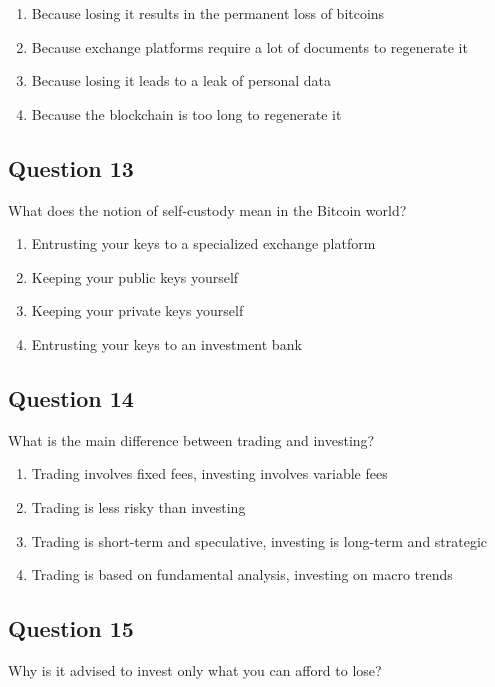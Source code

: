 \documentclass[12pt,a4paper]{article}
\begin{document}
\begin{enumerate}[label=\Alph*., leftmargin=*]
\item Because losing it results in the permanent loss of bitcoins
\item Because exchange platforms require a lot of documents to regenerate it
\item Because losing it leads to a leak of personal data
\item Because the blockchain is too long to regenerate it
\end{enumerate}

\bigskip


\subsection*{Question 13}
What does the notion of self-custody mean in the Bitcoin world?

\begin{enumerate}[label=\Alph*., leftmargin=*]
\item Entrusting your keys to a specialized exchange platform
\item Keeping your public keys yourself
\item Keeping your private keys yourself
\item Entrusting your keys to an investment bank
\end{enumerate}

\bigskip


\subsection*{Question 14}
What is the main difference between trading and investing?

\begin{enumerate}[label=\Alph*., leftmargin=*]
\item Trading involves fixed fees, investing involves variable fees
\item Trading is less risky than investing
\item Trading is short-term and speculative, investing is long-term and strategic
\item Trading is based on fundamental analysis, investing on macro trends
\end{enumerate}

\bigskip


\subsection*{Question 15}
Why is it advised to invest only what you can afford to lose?
\end{document}
